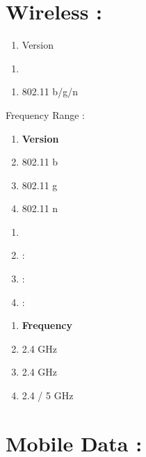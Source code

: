\documentclass{article}
\newcommand\tab[1][1cm]{\hspace*{#1}}
\begin{document}
\section{Wireless :}
\begin{multicols}{3}
\begin{enumerate}[label= ]
\item Version
\end{enumerate}
\columnbreak
\begin{enumerate}[label= ]
\item \textrightarrow
\end{enumerate}
\columnbreak
\begin{enumerate}[label= ]
\item 802.11 b/g/n
\end{enumerate}
\end{multicols}
\quad Frequency Range :
\begin{multicols}{3}
\begin{enumerate}[label= ]
\item \tab \textbf{Version}
\item \tab 802.11 b
\item \tab 802.11 g
\item \tab 802.11 n
\end{enumerate}
\columnbreak
\begin{enumerate}[label= ]
\item 
\item :
\item :
\item :
\end{enumerate}
\columnbreak
\begin{enumerate}[label= ]
\item \textbf{Frequency}
\item 2.4 GHz
\item 2.4 GHz
\item 2.4 / 5 GHz
\end{enumerate}
\end{multicols}
\vspace{0.02\textheight}
\section{Mobile Data :}
\vspace{0.02\textheight}
\end{document}
